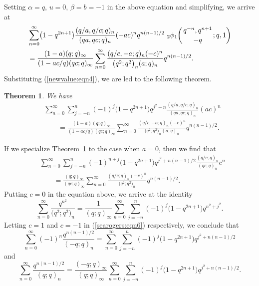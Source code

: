 \documentclass[pdftex]{sigma}
\numberwithin{equation}{section}
\newtheorem{Theorem}{Theorem}[section]
\begin{document}
Setting $\alpha=q$, $u=0$, $\beta=b=-1$ in the above equation and simplifying, we arrive at
\begin{align*}
	&\sum_{n=0}^\infty \bigl(1-q^{2n+1}\bigr)\frac{(q/a, q/c; q)_n}{(q a, q c; q)_n}(-ac)^n q^{n(n-1)/2}~ {_2\phi_1}\biggl({{q^{-n}, q^{n+1}}\atop{-q}}; q, 1\biggr)\\
	&=\frac{(1-a)(q; q )_\infty}{(1-ac/q)(qc; q )_\infty}
	\sum_{n=0}^\infty \frac{(q/c, -a; q)_n (-c)^n}{\bigl(q^2; q^2\bigr)_n (a; q)_n} q^{n(n-1)/2}.
\end{align*}
Substituting (\ref{newvalue:eqn4}), we are led to the following theorem.
\begin{Theorem}\label{andrrthm3} We have
\begin{align*} %
&\sum_{n=0}^\infty \sum_{j=-n}^n (-1)^{j}\bigl(1-q^{2n+1}\bigr) q^{j^2-n}
\frac{(q/a, q/c; q)_n}{(q a, q c; q)_n}(ac)^n \\
&\qquad{}=\frac{(1-a)(q; q )_\infty}{(1-ac/q)(qc; q )_\infty}
\sum_{n=0}^\infty \frac{(q/c, -a; q)_n (-c)^n}{\bigl(q^2; q^2\bigr)_n (a; q)_n} q^{n(n-1)/2}.\nonumber
\end{align*}
\end{Theorem}
If we specialize Theorem~\ref{andrrthm3} to the case when $a=0$, then we find that
\begin{align}
&\sum_{n=0}^\infty \sum_{j=-n}^n (-1)^{n+j}\bigl(1-q^{2n+1}\bigr) q^{j^2+n(n-1)/2}
\frac{(q/c; q)_n}{(q c; q)_n}c^n \nonumber\\
&\qquad{}=\frac{(q; q )_\infty}{(qc; q )_\infty}
\sum_{n=0}^\infty \frac{(q/c; q)_n (-c)^n}{\bigl(q^2; q^2\bigr)_n } q^{n(n-1)/2}.
\label{searogers:eqn6}
\end{align}
Putting $c=0$ in the equation above, we arrive at the identity \cite[equation~(4.12)]{Liu2013IJTN}
\begin{equation*}%
\sum_{n=0}^\infty \frac{q^{n^2}}{\bigl(q^2; q^2\bigr)_n}
=\frac{1}{(q; q)_\infty}
\sum_{n=0}^\infty \sum_{j=-n}^n (-1)^{j} \bigl(1-q^{2n+1}\bigr) q^{n^2+j^2}.
\end{equation*}
Letting $c=1$ and $c=-1$ in (\ref{searogers:eqn6}) respectively, we conclude that \cite[equation~(4.13)]{Liu2013IJTN}
\begin{equation*}%
\sum_{n=0}^\infty (-1)^{n} \frac{q^{n(n-1)/2}}{(-q; q)_n}
=\sum_{n=0}^\infty \sum_{j=-n}^n (-1)^{j} \bigl(1-q^{2n+1}\bigr) q^{j^2+n(n-1)/2}
\end{equation*}
and \cite[equation~(4.14)]{Liu2013IJTN}
\begin{equation*}%
	\sum_{n=0}^\infty \frac{q^{n(n-1)/2}}{(q; q)_n}
	=\frac{(-q; q)_\infty}{(q; q)_\infty}\sum_{n=0}^\infty \sum_{j=-n}^n (-1)^{j} \bigl(1-q^{2n+1}\bigr) q^{j^2+n(n-1)/2}.
\end{equation*}
\end{document}
